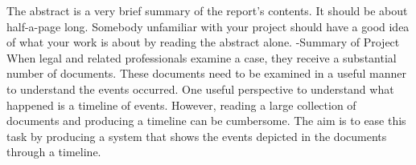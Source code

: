 The abstract is a very brief summary of the report's contents. It should be about half-a-page long. Somebody unfamiliar with your project should have a good idea of what your work is about by reading the abstract alone.
-Summary of Project
When legal and related professionals examine a case, they receive a substantial number of documents. These documents need to be examined in a useful manner to understand the events occurred. One useful perspective to understand what happened is a timeline of events. However, reading a large collection of documents and producing a timeline can be cumbersome. The aim is to ease this task by producing a system that shows the events depicted in the documents through a timeline.